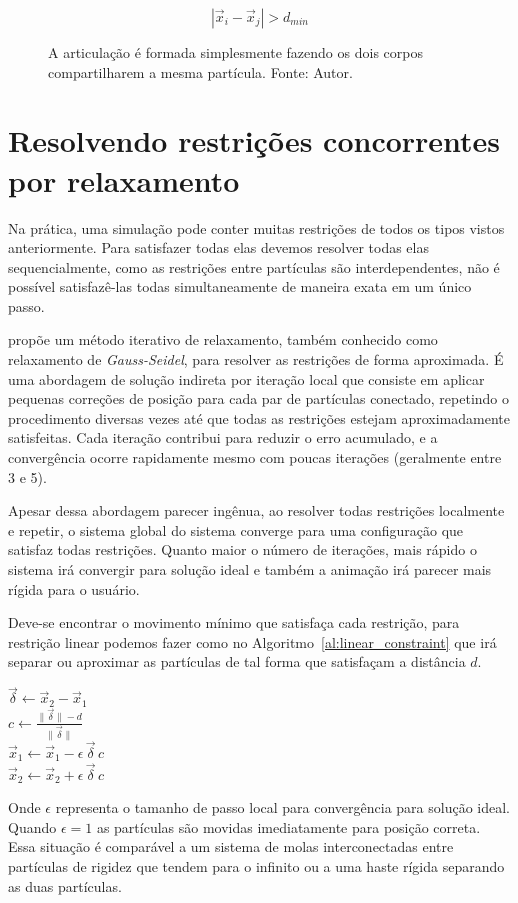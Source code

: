 $$|\vec x_i - \vec x_j| > d_{min}$$ 

\begin{figure}[htb]
	\centering
	
	\caption{A articulação é formada simplesmente fazendo os dois corpos compartilharem a mesma partícula. Fonte: Autor.}
	\label{fig:restricao-articulacao}
\end{figure}

\section{Resolvendo restrições concorrentes por relaxamento}

Na prática, uma simulação pode conter muitas restrições de todos os tipos vistos anteriormente. Para satisfazer todas elas devemos resolver todas elas sequencialmente, como as restrições entre partículas são interdependentes, não é possível satisfazê-las todas simultaneamente de maneira exata em um único passo.

 propõe um método iterativo de relaxamento, também conhecido como relaxamento de \textit{Gauss-Seidel}, para resolver as restrições de forma aproximada. É uma abordagem de solução indireta por iteração local que consiste em aplicar pequenas correções de posição para cada par de partículas conectado, repetindo o procedimento diversas vezes até que todas as restrições estejam aproximadamente satisfeitas. Cada iteração contribui para reduzir o erro acumulado, e a convergência ocorre rapidamente mesmo com poucas iterações (geralmente entre 3 e 5).

Apesar dessa abordagem parecer ingênua, ao resolver todas restrições localmente e repetir, o sistema global do sistema converge para uma configuração que satisfaz todas restrições. Quanto maior o número de iterações, mais rápido o sistema irá convergir para solução ideal e também a animação irá parecer mais rígida para o usuário.

Deve-se encontrar o movimento mínimo que satisfaça cada restrição, para restrição linear podemos fazer como no Algoritmo~\ref{al:linear_constraint} que irá separar ou aproximar as partículas de tal forma que satisfaçam a distância $d$.
\begin{algorithm}[htb]
	\caption{Relaxamento para restrição linear}
	$\vec{\delta} \leftarrow \vec x_2 - \vec x_1$ \\
	$c \leftarrow \frac{\|\vec{\delta}\| - d}{\|\vec{\delta}\|}$ \\
	$\vec x_1 \leftarrow \vec x_1 - \epsilon \, \vec{\delta} \, c$ \\
	$\vec x_2 \leftarrow \vec x_2 + \epsilon \, \vec{\delta} \, c$
	\label{al:linear_constraint}
\end{algorithm}
Onde $\epsilon$ representa o tamanho de passo local para convergência para solução ideal. Quando $\epsilon=1$ as partículas são movidas imediatamente para posição correta. Essa situação é comparável a um sistema de molas interconectadas entre partículas de rigidez que tendem para o infinito ou a uma haste rígida separando as duas partículas. 

